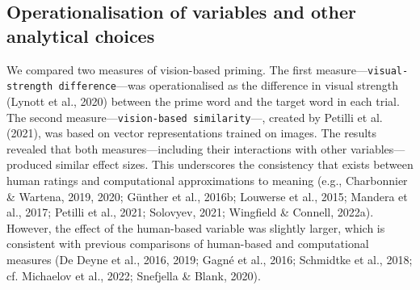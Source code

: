 \documentclass[
  12pt,
  man,floatsintext]{apa7}
\begin{document}
\hypertarget{operationalisation-of-variables-and-other-analytical-choices}{%
\subsection{Operationalisation of variables and other analytical choices}\label{operationalisation-of-variables-and-other-analytical-choices}}

We compared two measures of vision-based priming. The first measure---\texttt{visual-strength\ difference}---was operationalised as the difference in visual strength (Lynott et al., 2020) between the prime word and the target word in each trial. The second measure---\texttt{vision-based\ similarity}---, created by Petilli et al. (2021), was based on vector representations trained on images. The results revealed that both measures---including their interactions with other variables---produced similar effect sizes. This underscores the consistency that exists between human ratings and computational approximations to meaning (e.g., Charbonnier \& Wartena, 2019, 2020; Günther et al., 2016b; Louwerse et al., 2015; Mandera et al., 2017; Petilli et al., 2021; Solovyev, 2021; Wingfield \& Connell, 2022a). However, the effect of the human-based variable was slightly larger, which is consistent with previous comparisons of human-based and computational measures (De Deyne et al., 2016, 2019; Gagné et al., 2016; Schmidtke et al., 2018; cf. Michaelov et al., 2022; Snefjella \& Blank, 2020).
\end{document}
